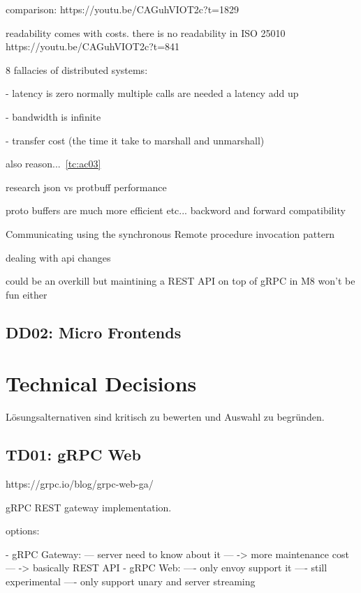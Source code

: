 
comparison: https://youtu.be/CAGuhVIOT2c?t=1829


readability comes with costs. there is no readability in ISO 25010
https://youtu.be/CAGuhVIOT2c?t=841

8 fallacies of distributed systems:

- latency is zero
normally multiple calls are needed a latency add up

- bandwidth is infinite

- transfer cost (the time it take to marshall and unmarshall)

also reason...~\ref{tc:ac03}

research json vs protbuff performance


proto buffers are much more efficient etc...
backword and forward compatibility

Communicating using the synchronous Remote
procedure invocation pattern \citep{richardson2018microservices}

dealing with api changes





could be an overkill but maintining a REST API on top of gRPC in M8 won't be fun either

\subsection{DD02: Micro Frontends}

\section{Technical Decisions}

Lösungsalternativen sind kritisch zu bewerten und Auswahl zu begründen.

\subsection{TD01: gRPC Web}

https://grpc.io/blog/grpc-web-ga/

gRPC REST gateway implementation.

options:

- gRPC Gateway:
--- server need to know about it
--- -> more maintenance cost
--- -> basically REST API
- gRPC Web: 
---- only envoy support it
---- still experimental
---- only support unary and server streaming

